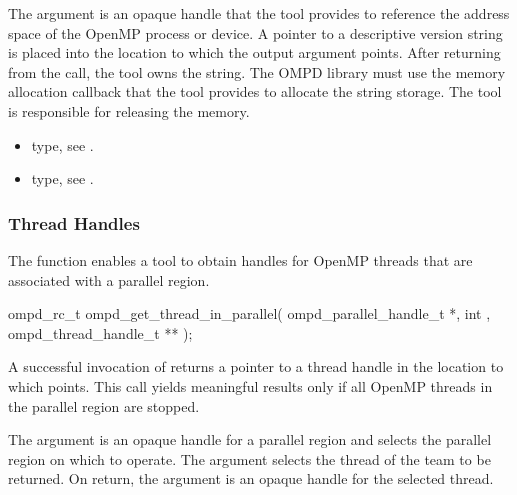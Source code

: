 \argdesc
The  argument is an opaque handle that the tool provides
to reference the address space of the OpenMP process or device. A pointer to 
a descriptive version string is placed into the location to which the 
 output argument points. After returning from the call, the tool 
owns the string. The OMPD library must use the memory allocation callback that 
the tool provides to allocate the string storage. The tool is responsible 
for releasing the memory.

\crossreferences
\begin{itemize}
\item {} type, 
see .

\item {} type, see .
\end{itemize}



\subsubsection{Thread Handles}



\label{subsubsubsec:ompd_get_thread_in_parallel}

\summary
The   function enables a tool to obtain 
handles for OpenMP threads that are associated with a parallel region.

\format
\begin{cspecific}
\begin{ompSyntax}
ompd_rc_t ompd_get_thread_in_parallel(
  ompd_parallel_handle_t *,
  int ,
  ompd_thread_handle_t **
);
\end{ompSyntax}
\end{cspecific}


\descr
A successful invocation of   returns a 
pointer to a thread handle in the location to which 
points. This call yields  meaningful results only if all OpenMP threads 
in the parallel region are stopped.

\argdesc
The  argument is an opaque handle for a parallel region
and selects the parallel region on which to operate. The  
argument selects the thread of the team to be returned. On return, the 
 argument is an opaque handle for the selected thread.

